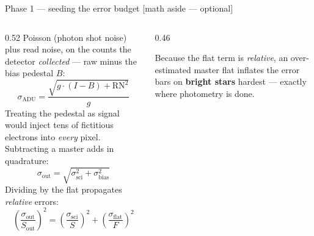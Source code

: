 \documentclass[10pt,aspectratio=169]{beamer}
\newcommand{\asidetag}{\hfill{\footnotesize\color{cassablue}[math aside --- optional]}}
\begin{document}
\begin{frame}{Phase 1 --- seeding the error budget \asidetag}
  \begin{columns}[T]
    \begin{column}{0.52\textwidth}
      Poisson (photon shot noise) plus read noise, on the counts the detector
      \emph{collected} --- raw minus the bias pedestal $B$:
      \[
        \sigma_{\text{ADU}} = \frac{\sqrt{g \cdot (I - B) + \text{RN}^2}}{g}
      \]
      {\footnotesize Treating the pedestal as signal would inject tens of
      fictitious electrons into \emph{every} pixel.}
      Subtracting a master adds in quadrature:
      \[
        \sigma_{\text{out}} = \sqrt{\sigma_{\text{sci}}^2 + \sigma_{\text{bias}}^2}
      \]
      Dividing by the flat propagates \emph{relative} errors:
      \[
        \left(\frac{\sigma_{\text{out}}}{S_{\text{out}}}\right)^2 =
        \left(\frac{\sigma_{\text{sci}}}{S}\right)^2 +
        \left(\frac{\sigma_{\text{flat}}}{F}\right)^2
      \]
    \end{column}
    \begin{column}{0.46\textwidth}
      \centering

      \vspace{0.4em}
      {\tiny Because the flat term is \emph{relative}, an over-estimated master flat
      inflates the error bars on \textbf{bright stars} hardest --- exactly where
      photometry is done.}
    \end{column}
  \end{columns}
\end{frame}

\end{document}

